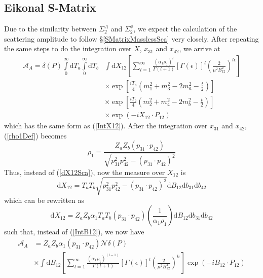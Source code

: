 \subsection{Eikonal S-Matrix\label{SMatrixVec}}
Due to the similarity between $\Sigma_{2}^{A}$ and $\Sigma_{2}^{\phi}$, we expect the calculation of the scattering amplitude to follow \S\ref{SMatrixMasslessSca} very closely. After repeating the same steps to do the integration over $X$, $x_{31}$ and $x_{42}$, we arrive at
\begin{equation}
\begin{split}
	\mathcal{A}_{A} = \delta(P) \int\limits_{0}^{\infty} \mathrm{d}T_{a} \int\limits_{0}^{\infty} \mathrm{d}T_{b} {}& \int \mathrm{d}X_{12} \left[ \sum_{l = 1}^{\infty} \frac{\left(\alpha_{1} \rho_{1} \right)^{l}}{\Gamma(l + 1)} [\Gamma(\epsilon)]^{l} \left(\frac{2}{\mu^{2} B_{12}^{2}} \right)^{l \epsilon} \right] \\
	&\times \exp{\left[ \frac{i T_{a}}{4} \left(m_{1}^{2} + m_{3}^{2} - 2 m_{a}^{2} - \frac{t}{2} \right) \right]} \\
	&\times \exp{\left[ \frac{i T_{b}}{4} \left(m_{2}^{2} + m_{4}^{2} - 2 m_{b}^{2} - \frac{t}{2} \right) \right]} \\
	&\times \exp{\left(- i X_{12} \cdot P_{12} \right)}
\end{split} \label{IntX12A}
\end{equation}
which has the same form as (\ref{IntX12}). After the integration over $x_{31}$ and $x_{42}$, (\ref{rho1Def}) becomes
\begin{equation}
	\rho_{1} = \frac{Z_{a} Z_{b} (p_{31} \cdot p_{42})}{\sqrt{p_{31}^{2} p_{42}^{2} - (p_{31} \cdot p_{42})^{2}}}
\end{equation}
Thus, instead of (\ref{dX12Sca}), now the measure over $X_{12}$ is
\begin{equation}
	\mathrm{d}X_{12} = T_{a} T_{b} \sqrt{p_{31}^{2} p_{42}^{2} - (p_{31} \cdot p_{42})^{2}} \mathrm{d}B_{12} \mathrm{d}b_{31} \mathrm{d}b_{42} 
\end{equation}
which can be rewritten as
\begin{equation}
	\mathrm{d}X_{12} = Z_{a} Z_{b} \alpha_{1} T_{a} T_{b} \left( p_{31} \cdot p_{42} \right) \left( \frac{1}{\alpha_{1} \rho_{1}} \right) \mathrm{d}B_{12} \mathrm{d}b_{31} \mathrm{d}b_{42}
\end{equation}
such that, instead of (\ref{IntB12}), we now have
\begin{equation}
\begin{split}
	\mathcal{A}_{A} &= Z_{a} Z_{b} \alpha_{1} \left( p_{31} \cdot p_{42} \right) \mathcal{N} \delta(P) \\
	&\times \int \mathrm{d}B_{12} \left[ \sum_{l = 1}^{\infty} \frac{\left(\alpha_{1} \rho_{1} \right)^{(l - 1)}}{\Gamma(l + 1)} [\Gamma(\epsilon)]^{l} \left(\frac{2}{\mu^{2} B_{12}^{2}} \right)^{l \epsilon} \right] \exp{\left( - i B_{12} \cdot P_{12} \right)}
\end{split} \label{IntB12A}
\end{equation}
